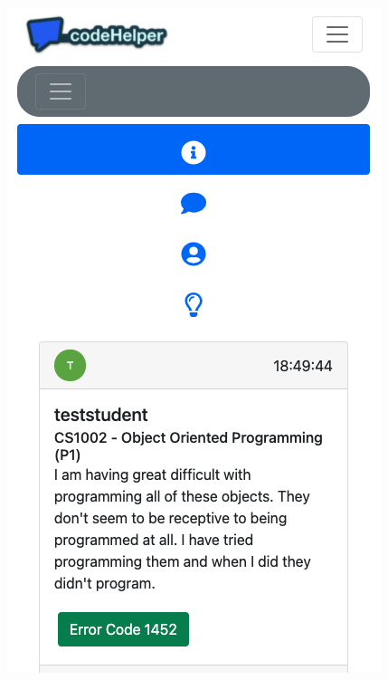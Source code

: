 \begin{figure}[H]
\centering
\begin{minipage}{.5\textwidth}
  \centering
  \includegraphics[width=\linewidth]{8implementation/images/mobDemDesk.png}
  \label{fig:mobDemDesk}
\end{minipage}%
\begin{minipage}{.5\textwidth}
  \centering

\end{minipage}
\end{figure}
